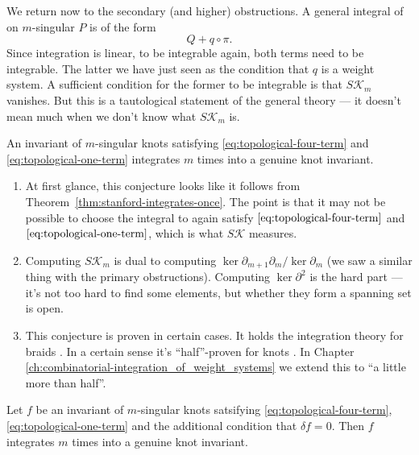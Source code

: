 We return now to the secondary (and higher) obstructions. A general integral of on \(m\)-singular \(P\) is of the form
\[Q + q \circ \pi.\]
Since integration is linear, to be integrable again, both terms need to be integrable. The latter we have just seen as the condition that \(q\) is a weight system. A sufficient condition for the former to be integrable is that \(S\mathcal{K}_{m}\) vanishes. But this is a tautological statement of the general theory --- it doesn't mean much when we don't know what \(S\mathcal{K}_{m}\) is.

\begin{conjecture}
	\label{conj:every-t4t-t1t-integrates}
	An invariant of \(m\)-singular knots satisfying \textup{\ref{eq:topological-four-term}} and \textup{\ref{eq:topological-one-term}} integrates \(m\) times into a genuine knot invariant.
\end{conjecture}

\begin{remarks}
	\begin{enumerate}
		\item At first glance, this conjecture looks like it follows from Theorem~\ref{thm:stanford-integrates-once}. The point is that it may not be possible to choose the integral to again satisfy \(\ref{eq:topological-four-term}\) and \(\ref{eq:topological-one-term}\), which is what \(S\mathcal{K}\) measures.
		\item Computing \(S\mathcal{K}_{m}\) is dual to computing \(\ker \partial_{m + 1} \partial_{m} / \ker \partial_{m}\) (we saw a similar thing with the primary obstructions). Computing \(\ker \partial^{2}\) is the hard part --- it's not too hard to find some elements, but whether they form a spanning set is open.
		\item This conjecture is proven in certain cases. It holds the integration theory for braids \cite{integration-of-singular-braid-invariants}. In a certain sense it's ``half''-proven for knots \cite{a-combinatorial-half-integration-from-weight-system-to-vassiliev-knot-invariant}. In Chapter \ref{ch:combinatorial-integration_of_weight_systems} we extend this to ``a little more than half''.
	\end{enumerate}
\end{remarks}


\begin{theorem}
	\label{thm:fundamental-theorem-of-vassiliev-invariants}
	Let \(f\) be an invariant of \(m\)-singular knots satsifying \textup{\ref{eq:topological-four-term}}, \textup{\ref{eq:topological-one-term}} and the additional condition that \(\delta f = 0\). Then \(f\) integrates \(m\) times into a genuine knot invariant.
\end{theorem}

